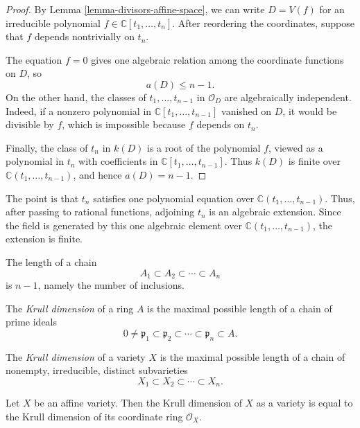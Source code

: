 \begin{proof}
By Lemma
\ref{lemma-divisors-affine-space},
we can write $D=V(f)$ for an irreducible
polynomial
$f\in \mathbb{C}[t_1,\ldots,t_n]$.
After reordering the coordinates, suppose
that $f$ depends nontrivially on $t_n$.

The equation $f=0$ gives one algebraic
relation among the coordinate functions
on $D$, so
$$
a(D)\leq n-1.
$$
On the other hand, the classes of
$t_1,\ldots,t_{n-1}$ in $\mathcal{O}_D$
are algebraically independent.
Indeed, if a nonzero polynomial in
$\mathbb{C}[t_1,\ldots,t_{n-1}]$
vanished on $D$, it would be divisible
by $f$, which is impossible because
$f$ depends on $t_n$.

Finally, the class of $t_n$ in $k(D)$
is a root of the polynomial $f$,
viewed as a polynomial in $t_n$
with coefficients in
$\mathbb{C}[t_1,\ldots,t_{n-1}]$.
Thus $k(D)$ is finite over
$\mathbb{C}(t_1,\ldots,t_{n-1})$,
and hence $a(D)=n-1$.
\end{proof}

\noindent
The point is that $t_n$ satisfies one
polynomial equation over
$\mathbb{C}(t_1,\ldots,t_{n-1})$.
Thus, after passing to rational functions,
adjoining $t_n$ is an algebraic extension.
Since the field is generated by this one
algebraic element over
$\mathbb{C}(t_1,\ldots,t_{n-1})$,
the extension is finite.

\medskip\noindent
The length of a chain
$$
A_1\subset A_2\subset \cdots \subset A_n
$$
is $n-1$, namely the number of inclusions.

\begin{definition}
\label{definition-krull-dimension-ring}
The {\it Krull dimension} of a ring $A$
is the maximal possible length of a chain
of prime ideals
$$
0\neq \mathfrak{p}_1
\subset \mathfrak{p}_2
\subset \cdots
\subset \mathfrak{p}_n
\subset A.
$$
\end{definition}

\begin{definition}
\label{definition-krull-dimension-variety}
The {\it Krull dimension} of a variety $X$
is the maximal possible length of a chain
of nonempty, irreducible, distinct
subvarieties
$$
X_1\subset X_2\subset \cdots \subset X_n.
$$
\end{definition}

\begin{theorem}
\label{theorem-krull-algebraic-geometric}
Let $X$ be an affine variety.
Then the Krull dimension of $X$ as a
variety is equal to the Krull dimension
of its coordinate ring $\mathcal{O}_X$.
\end{theorem}

